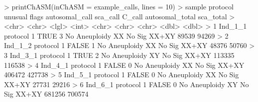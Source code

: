 \documentclass[
  letterpaper,
  DIV=11,
  numbers=noendperiod]{scrartcl}
\newenvironment{Shaded}{\begin{snugshade}}{\end{snugshade}}
\newcommand{\AttributeTok}[1]{\textcolor[rgb]{0.40,0.45,0.13}{#1}}
\newcommand{\ConstantTok}[1]{\textcolor[rgb]{0.56,0.35,0.01}{#1}}
\newcommand{\DecValTok}[1]{\textcolor[rgb]{0.68,0.00,0.00}{#1}}
\newcommand{\ErrorTok}[1]{\textcolor[rgb]{0.68,0.00,0.00}{#1}}
\newcommand{\FunctionTok}[1]{\textcolor[rgb]{0.28,0.35,0.67}{#1}}
\newcommand{\NormalTok}[1]{\textcolor[rgb]{0.00,0.23,0.31}{#1}}
\newcommand{\SpecialCharTok}[1]{\textcolor[rgb]{0.37,0.37,0.37}{#1}}
\begin{document}
\begin{Shaded}
\begin{Highlighting}[]
\SpecialCharTok{\textgreater{}} \FunctionTok{printChASM}\NormalTok{(}\AttributeTok{inChASM =}\NormalTok{ example\_calls, }\AttributeTok{lines =} \DecValTok{10}\NormalTok{)}
\SpecialCharTok{\textgreater{}}\NormalTok{    sample   protocol   unusual flags autosomal\_call sca\_call C\_call       autosomal\_total sca\_total}
\SpecialCharTok{\textgreater{}}    \ErrorTok{\textless{}}\NormalTok{chr}\SpecialCharTok{\textgreater{}}    \ErrorTok{\textless{}}\NormalTok{chr}\SpecialCharTok{\textgreater{}}      \ErrorTok{\textless{}}\NormalTok{lgl}\SpecialCharTok{\textgreater{}}   \ErrorTok{\textless{}}\NormalTok{int}\SpecialCharTok{\textgreater{}} \ErrorTok{\textless{}}\NormalTok{chr}\SpecialCharTok{\textgreater{}}          \ErrorTok{\textless{}}\NormalTok{chr}\SpecialCharTok{\textgreater{}}    \ErrorTok{\textless{}}\NormalTok{chr}\SpecialCharTok{\textgreater{}}                  \ErrorTok{\textless{}}\NormalTok{dbl}\SpecialCharTok{\textgreater{}}     \ErrorTok{\textless{}}\NormalTok{dbl}\SpecialCharTok{\textgreater{}}
\ErrorTok{\textgreater{}}  \DecValTok{1}\NormalTok{ Ind\_1\_1  protocol }\DecValTok{1} \ConstantTok{TRUE}        \DecValTok{3}\NormalTok{ No Aneuploidy  XX       No Sig XX}\SpecialCharTok{+}\NormalTok{XY           }\DecValTok{89539}     \DecValTok{94269}
\SpecialCharTok{\textgreater{}}  \DecValTok{2}\NormalTok{ Ind\_1\_2  protocol }\DecValTok{1} \ConstantTok{FALSE}       \DecValTok{1}\NormalTok{ No Aneuploidy  XX       No Sig XX}\SpecialCharTok{+}\NormalTok{XY           }\DecValTok{48376}     \DecValTok{50760}
\SpecialCharTok{\textgreater{}}  \DecValTok{3}\NormalTok{ Ind\_3\_1  protocol }\DecValTok{1} \ConstantTok{TRUE}        \DecValTok{2}\NormalTok{ No Aneuploidy  XY       No Sig XX}\SpecialCharTok{+}\NormalTok{XY          }\DecValTok{113335}    \DecValTok{116538}
\SpecialCharTok{\textgreater{}}  \DecValTok{4}\NormalTok{ Ind\_4\_1  protocol }\DecValTok{1} \ConstantTok{FALSE}       \DecValTok{0}\NormalTok{ No Aneuploidy  XX       No Sig XX}\SpecialCharTok{+}\NormalTok{XY          }\DecValTok{406472}    \DecValTok{427738}
\SpecialCharTok{\textgreater{}}  \DecValTok{5}\NormalTok{ Ind\_5\_1  protocol }\DecValTok{1} \ConstantTok{FALSE}       \DecValTok{0}\NormalTok{ No Aneuploidy  XX       No Sig XX}\SpecialCharTok{+}\NormalTok{XY           }\DecValTok{27731}     \DecValTok{29216}
\SpecialCharTok{\textgreater{}}  \DecValTok{6}\NormalTok{ Ind\_6\_1  protocol }\DecValTok{1} \ConstantTok{FALSE}       \DecValTok{0}\NormalTok{ No Aneuploidy  XY       No Sig XX}\SpecialCharTok{+}\NormalTok{XY          }\DecValTok{681256}    \DecValTok{700574}

\end{Highlighting}
\end{Shaded}
\end{document}
